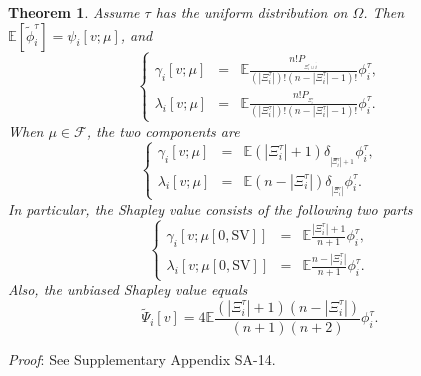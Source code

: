 \documentclass[a4paper,12pt]{article}
\newtheorem{theorem}{Theorem}
\begin{document}
\begin{theorem}\label{thm:sq}
Assume $\tau$ has the uniform distribution on $\Omega$. Then
$\mathbb{E} [\tilde \phi^\tau_i] = \psi_i[v;\mu]$, and
\begin{equation}\label{eq:sequel_phi}
\left \{
\begin{array}{rcl}
\gamma_i[v;\mu]
&=& 
\mathbb{E} \frac{n! P_ {_{\Xi_i^\tau \cup \overline{i}}}}{(|\Xi_i^\tau|)!(n-|\Xi_i^\tau| - 1)!} \phi^\tau_i, \\ 

\lambda_i[v;\mu]
&=&
\mathbb{E} \frac{n! P_{_{\Xi_i^\tau}}}{(|\Xi_i^\tau|)!(n-|\Xi_i^\tau| - 1)!} \phi^\tau_i.
\end{array}
\right .
\end{equation}
When $\mu \in \mathscr{F}$, the two components are
\begin{equation}\label{eq:sequel_phi_noprior}
\left \{
\begin{array}{rcl}
\gamma_i[v;\mu]
&=&
\mathbb{E} (|\Xi_i^\tau|+1) \delta_{_{|\Xi_i^\tau|+1}} \phi^\tau_i, \\ 

\lambda_i[v;\mu]
&=&
\mathbb{E} (n-|\Xi_i^\tau|)\delta_{_{|\Xi_i^\tau|}} \phi^\tau_i.
\end{array}
\right .
\end{equation}
In particular,  the Shapley value consists of the following two parts
\begin{equation}\label{eq:ShapleyGainLoss}
\left \{
\begin{array}{rcl}
\gamma_i[v;\mu[0,\mathrm{SV}]]&=& \mathbb{E} \frac{|\Xi_i^\tau|+1}{n+1} \phi^\tau_i , \\
\lambda_i[v;\mu[0,\mathrm{SV}]]&=& \mathbb{E}\frac{n-|\Xi_i^\tau|}{n+1} \phi^\tau_i .
\end{array}
\right .
\end{equation}
Also, the unbiased Shapley value equals
\begin{equation}\label{eq:unbiasedShapleyValue}
\tilde \Psi_i[v]= 4 \mathbb{E} \frac{(|\Xi_i^\tau|+1)(n-|\Xi_i^\tau|)}{(n+1)(n+2)} \phi^\tau_i .
\end{equation}
\end{theorem}

\noindent \textit{Proof}: See Supplementary Appendix SA-14.
\end{document}
